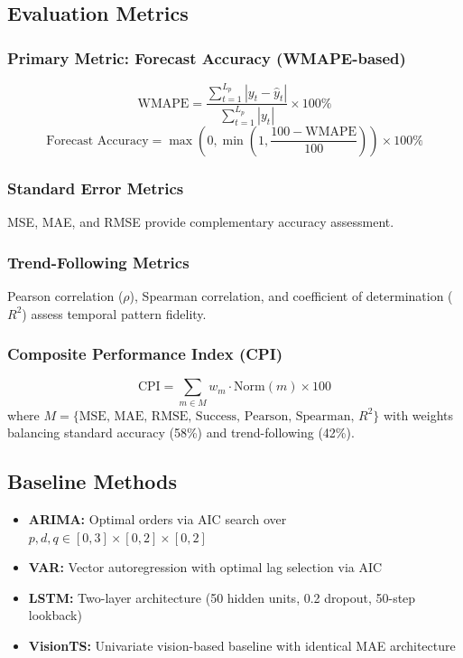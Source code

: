 \documentclass[preprint,12pt,authoryear]{elsarticle}
\begin{document}
\subsection{Evaluation Metrics}

\subsubsection{Primary Metric: Forecast Accuracy (WMAPE-based)}

\begin{equation}
    \text{WMAPE} = \frac{\sum_{t=1}^{L_p} |y_t - \hat{y}_t|}{\sum_{t=1}^{L_p} |y_t|} \times 100\%
\end{equation}
\begin{equation}
    \text{Forecast Accuracy} = \max\left(0, \min\left(1, \frac{100 - \text{WMAPE}}{100}\right)\right) \times 100\%
\end{equation}

\subsubsection{Standard Error Metrics}

MSE, MAE, and RMSE provide complementary accuracy assessment.

\subsubsection{Trend-Following Metrics}

Pearson correlation ($\rho$), Spearman correlation, and coefficient of determination ($R^2$) assess temporal pattern fidelity.

\subsubsection{Composite Performance Index (CPI)}

\begin{equation}
    \text{CPI} = \sum_{m \in M} w_m \cdot \text{Norm}(m) \times 100
\end{equation}
where $M = \{\text{MSE, MAE, RMSE, Success, Pearson, Spearman, } R^2\}$ with weights balancing standard accuracy (58\%) and trend-following (42\%).

\subsection{Baseline Methods}

\begin{itemize}
    \item \textbf{ARIMA:} Optimal orders via AIC search over $p,d,q \in [0,3] \times [0,2] \times [0,2]$
    \item \textbf{VAR:} Vector autoregression with optimal lag selection via AIC
    \item \textbf{LSTM:} Two-layer architecture (50 hidden units, 0.2 dropout, 50-step lookback)
    \item \textbf{VisionTS:} Univariate vision-based baseline with identical MAE architecture
\end{itemize}
\end{document}
